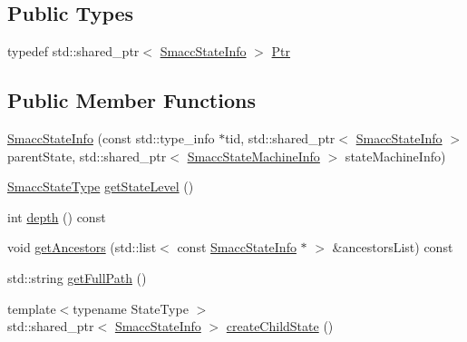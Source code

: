\subsection*{Public Types}
\begin{DoxyCompactItemize}
\item 
typedef std\+::shared\+\_\+ptr$<$ \hyperlink{classsmacc_1_1introspection_1_1SmaccStateInfo}{Smacc\+State\+Info} $>$ \hyperlink{classsmacc_1_1introspection_1_1SmaccStateInfo_a374ef2022bca958ab14469931fc4dcc1}{Ptr}
\end{DoxyCompactItemize}
\subsection*{Public Member Functions}
\begin{DoxyCompactItemize}
\item 
\hyperlink{classsmacc_1_1introspection_1_1SmaccStateInfo_a262bc6242d8a3b2c29c34b4cf325dfb4}{Smacc\+State\+Info} (const std\+::type\+\_\+info $\ast$tid, std\+::shared\+\_\+ptr$<$ \hyperlink{classsmacc_1_1introspection_1_1SmaccStateInfo}{Smacc\+State\+Info} $>$ parent\+State, std\+::shared\+\_\+ptr$<$ \hyperlink{classsmacc_1_1introspection_1_1SmaccStateMachineInfo}{Smacc\+State\+Machine\+Info} $>$ state\+Machine\+Info)
\item 
\hyperlink{namespacesmacc_1_1introspection_a710cf406873961567c11027582c7f720}{Smacc\+State\+Type} \hyperlink{classsmacc_1_1introspection_1_1SmaccStateInfo_a360141a4883f0122a9f5e8b7de456084}{get\+State\+Level} ()
\item 
int \hyperlink{classsmacc_1_1introspection_1_1SmaccStateInfo_afbf3165f49cfd6cdb842120a6317a2cb}{depth} () const 
\item 
void \hyperlink{classsmacc_1_1introspection_1_1SmaccStateInfo_a52bc1e54bd09ea267b3ecebf4bd11411}{get\+Ancestors} (std\+::list$<$ const \hyperlink{classsmacc_1_1introspection_1_1SmaccStateInfo}{Smacc\+State\+Info} $\ast$ $>$ \&ancestors\+List) const 
\item 
std\+::string \hyperlink{classsmacc_1_1introspection_1_1SmaccStateInfo_a22e625806a74808ee272df5c034d122e}{get\+Full\+Path} ()
\item 
{\footnotesize template$<$typename State\+Type $>$ }\\std\+::shared\+\_\+ptr$<$ \hyperlink{classsmacc_1_1introspection_1_1SmaccStateInfo}{Smacc\+State\+Info} $>$ \hyperlink{classsmacc_1_1introspection_1_1SmaccStateInfo_a287664f0ac1c0380bad11ef6973cde8d}{create\+Child\+State} ()
\item 

\end{DoxyCompactItemize}
